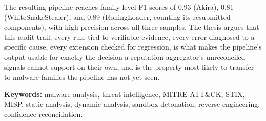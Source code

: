 The resulting pipeline reaches family-level F1 scores of 0.93 (Akira),
0.81 (WhiteSnakeStealer), and 0.89 (RoningLoader, counting its
resubmitted components), with high precision across all three
samples. The thesis argues that this audit trail, every rule tied to
verifiable evidence, every error diagnosed to a specific cause, every
extension checked for regression, is what makes the pipeline's output
usable for exactly the decision a reputation aggregator's unreconciled
signals cannot support on their own, and is the property most likely
to transfer to malware families the pipeline has not yet seen.

\bigskip
\noindent\textbf{Keywords:} malware analysis, threat intelligence,
MITRE ATT\&CK, STIX, MISP, static analysis, dynamic analysis, sandbox
detonation, reverse engineering, confidence reconciliation.
